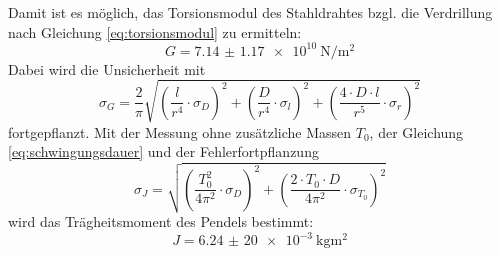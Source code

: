 Damit ist es möglich, das Torsionsmodul des Stahldrahtes bzgl. die Verdrillung nach Gleichung \eqref{eq:torsionsmodul} zu ermitteln:
\begin{equation*}
    G = \qty{7.14(117)e10}{\newton\per\square\meter}
\end{equation*}
Dabei wird die Unsicherheit mit
\begin{equation*}
    \sigma_G = \frac{2}{\pi} \sqrt{\left(\frac{l}{r^4} \cdot \sigma_D\right)^2 + \left(\frac{D}{r^4} \cdot \sigma_l\right)^2 + \left(\frac{4 \cdot D \cdot l}{r^5} \cdot \sigma_r\right)^2}
\end{equation*}
fortgepflanzt.
Mit der Messung ohne zusätzliche Massen $T_0$, der Gleichung \eqref{eq:schwingungsdauer} und der Fehlerfortpflanzung
\begin{equation*}
    \sigma_J = \sqrt{\left(\frac{T_0^2}{4 \pi^2} \cdot \sigma_D\right)^2 + \left(\frac{2 \cdot T_0 \cdot D}{4 \pi^2} \cdot \sigma_{T_0}\right)^2}
\end{equation*}
wird das Trägheitsmoment des Pendels bestimmt:
\begin{equation*}
    J = \qty{6,24(20)e-3}{\kilo\gram\meter\squared}
\end{equation*}
